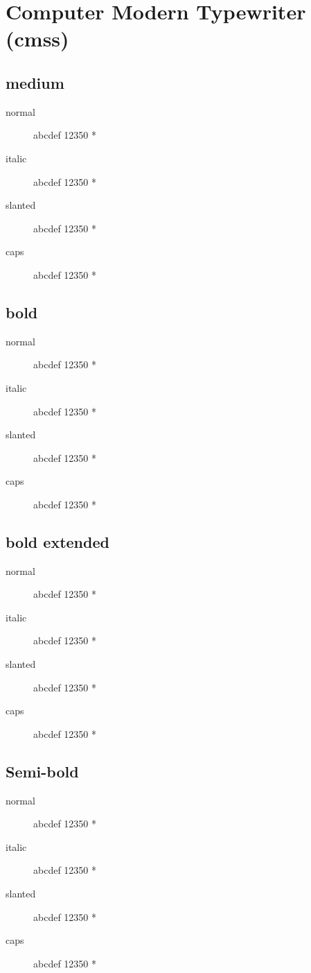 \section{Computer Modern Typewriter (cmss)}

\subsection{medium}
\begin{description}
    \item [normal]  abcdef 12350 *
    \item [italic]  abcdef 12350 *
    \item [slanted]  abcdef 12350 *
    \item [caps]  abcdef 12350 *
\end{description}
    
\subsection{bold}
\begin{description}
    \item [normal]  abcdef 12350 *
    \item [italic]  abcdef 12350 *
    \item [slanted]  abcdef 12350 *
    \item [caps]  abcdef 12350 *
\end{description}
    
\subsection{bold extended}
\begin{description}
    \item [normal]  abcdef 12350 *
    \item [italic]  abcdef 12350 *
    \item [slanted]  abcdef 12350 *
    \item [caps]  abcdef 12350 *
\end{description}

\subsection{Semi-bold}
\begin{description}
    \item [normal]  abcdef 12350 *
    \item [italic]  abcdef 12350 *
    \item [slanted]  abcdef 12350 *
    \item [caps]  abcdef 12350 *
\end{description}

